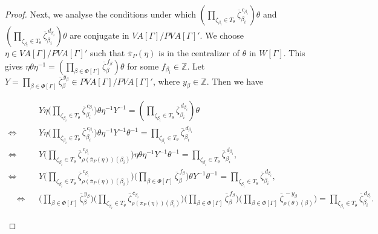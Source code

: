 \documentclass[10pt,a4paper]{amsart}
\begin{document}
\begin{proof}
Next, we analyse the conditions under which  $(\prod_{\zeta_{\beta_i}\in T_{\theta}} \overline{\zeta}_{\beta_i}^{\, c_{\beta_i}})\theta$ and $(\prod_{\zeta_{\beta_i}\in T_{\theta}} \overline{\zeta}_{\beta_i}^{\, d_{\beta_i}})\theta$ are conjugate in $VA[\Gamma]/PVA[\Gamma]'$. We choose $\eta\in VA[\Gamma]/PVA[\Gamma]'$ such that $\overline{\pi}_P(\eta)$ is in the centralizer of $\theta$ in $W[\Gamma]$. This gives $\eta\theta\eta^{-1}= (\prod_{\beta\in \Phi[\Gamma]} \overline{\zeta}_{\beta}^{\, f_{\beta}})\theta$ for some $f_{\beta_i} \in \mathbb{Z}$. Let $Y=\prod_{\beta \in \Phi[\Gamma]}\overline{\zeta}_{\beta}^{\,y_\beta}\in PVA[\Gamma]/PVA[\Gamma]'$, where $y_\beta\in\mathbb Z$. Then we have
\begin{small}
\begin{eqnarray}
\nonumber & & Y\eta \Bigg(\prod_{\zeta_{\beta_i}\in T_{\theta}} \overline{\zeta}_{\beta_i}^{\, c_{\beta_i}} \Bigg) \theta\eta^{-1}Y^{-1}=(\prod_{\zeta_{\beta_i}\in T_{\theta}} \overline{\zeta}_{\beta_i}^{\,d_{\beta_i}})\theta\\
\nonumber  \Leftrightarrow & & Y\eta \Bigg(\prod_{\zeta_{\beta_i}\in T_{\theta}}\overline{\zeta}_{\beta_i}^{\,c_{\beta_i}}\Bigg) \theta\eta^{-1}Y^{-1}\theta^{-1}=\prod_{\zeta_{\beta_i}\in T_{\theta}} \overline{\zeta}_{\beta_i}^{\, d_{\beta_i}}\\
\nonumber  \Leftrightarrow & & Y \Bigg(\prod_{\zeta_{\beta_i}\in T_{\theta}} \overline{\zeta}_{{\rho(\overline{\pi}_P(\eta))(\beta_i)}}^{\,c_{\beta_i}}\Bigg) \eta\theta\eta^{-1}Y^{-1}\theta^{-1}=\prod_{\zeta_{\beta_i}\in T_{\theta}} \overline{\zeta}_{\beta_i}^{\,d_{\beta_i}} ,\\
\nonumber  \Leftrightarrow & & Y \Bigg(\prod_{\zeta_{\beta_i}\in T_{\theta}} \overline{\zeta}_{{\rho(\overline{\pi}_P(\eta))(\beta_i)}}^{\, c_{\beta_i}}\Bigg) \Bigg(\prod_{\beta \in \Phi[\Gamma]} \overline{\zeta}_{\beta}^{\,f_\beta} \Bigg) \theta Y^{-1}\theta^{-1}=\prod_{\zeta_{\beta_i}\in T_{\theta}} \overline{\zeta}_{\beta_i}^{\,d_{\beta_i}},\\
\label{mid equation} \quad \Leftrightarrow & & \Bigg(\prod_{\beta \in \Phi[\Gamma]}\overline{\zeta}_{\beta}^{\,y_\beta} \Bigg) \Bigg(\prod_{\zeta_{\beta_i} \in T_{\theta}} \overline{\zeta}_{{\rho(\overline{\pi}_P(\eta))(\beta_i)}}^{\,c_{\beta_i}} \Bigg) \Bigg(\prod_{\beta \in \Phi[\Gamma]} \overline{\zeta}_{\beta}^{\,f_\beta} \Bigg) \Bigg(\prod_{\beta \in \Phi[\Gamma]}\overline{\zeta}_{{\rho(\theta)(\beta)}}^{\, -y_\beta} \Bigg)=\prod_{\zeta_{\beta_i}\in T_{\theta}} \overline{\zeta}_{\beta_i}^{\,d_{\beta_i}}.
\end{eqnarray}
\end{small}



\end{proof}
\end{document}

